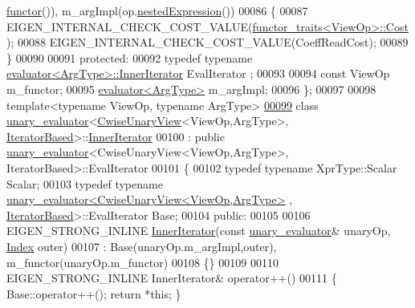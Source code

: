 \begin{DoxyCode}
      \hyperlink{group___core___module_af01271cdadcbcf195b5d3130ff2e1a48}{functor}()), m\_argImpl(op.\hyperlink{group___core___module_a21d59e387e600b1d650cb002175760b4}{nestedExpression}())
00086     \{
00087       EIGEN\_INTERNAL\_CHECK\_COST\_VALUE(\hyperlink{struct_eigen_1_1internal_1_1functor__traits}{functor\_traits<ViewOp>::Cost});
00088       EIGEN\_INTERNAL\_CHECK\_COST\_VALUE(CoeffReadCost);
00089     \}
00090 
00091   \textcolor{keyword}{protected}:
00092     \textcolor{keyword}{typedef} \textcolor{keyword}{typename} \hyperlink{struct_eigen_1_1internal_1_1evaluator}{evaluator<ArgType>::InnerIterator}        EvalIterator
      ;
00093     
00094     \textcolor{keyword}{const} ViewOp m\_functor;
00095     \hyperlink{struct_eigen_1_1internal_1_1evaluator}{evaluator<ArgType>} m\_argImpl;
00096 \};
00097 
00098 \textcolor{keyword}{template}<\textcolor{keyword}{typename} ViewOp, \textcolor{keyword}{typename} ArgType>
\hyperlink{class_eigen_1_1internal_1_1unary__evaluator_3_01_cwise_unary_view_3_01_view_op_00_01_arg_type_011a5afe598192a9657664b0cfbd26765b}{00099} \textcolor{keyword}{class }\hyperlink{struct_eigen_1_1internal_1_1unary__evaluator}{unary\_evaluator}<\hyperlink{group___core___module_class_eigen_1_1_cwise_unary_view}{CwiseUnaryView}<ViewOp,ArgType>, 
      \hyperlink{struct_eigen_1_1internal_1_1_iterator_based}{IteratorBased}>::\hyperlink{class_eigen_1_1_inner_iterator}{InnerIterator}
00100     : \textcolor{keyword}{public} \hyperlink{struct_eigen_1_1internal_1_1unary__evaluator}{unary\_evaluator}<CwiseUnaryView<ViewOp,ArgType>, IteratorBased>::EvalIterator
00101 \{
00102     \textcolor{keyword}{typedef} \textcolor{keyword}{typename} XprType::Scalar Scalar;
00103     \textcolor{keyword}{typedef} \textcolor{keyword}{typename} \hyperlink{struct_eigen_1_1internal_1_1unary__evaluator}{unary\_evaluator<CwiseUnaryView<ViewOp,ArgType>}
      , \hyperlink{struct_eigen_1_1internal_1_1_iterator_based}{IteratorBased}>::EvalIterator Base;
00104   \textcolor{keyword}{public}:
00105 
00106     EIGEN\_STRONG\_INLINE \hyperlink{class_eigen_1_1_inner_iterator}{InnerIterator}(\textcolor{keyword}{const} \hyperlink{struct_eigen_1_1internal_1_1unary__evaluator}{unary\_evaluator}& unaryOp, 
      \hyperlink{namespace_eigen_a62e77e0933482dafde8fe197d9a2cfde}{Index} outer)
00107       : Base(unaryOp.m\_argImpl,outer), m\_functor(unaryOp.m\_functor)
00108     \{\}
00109 
00110     EIGEN\_STRONG\_INLINE InnerIterator& operator++()
00111     \{ Base::operator++(); \textcolor{keywordflow}{return} *\textcolor{keyword}{this}; \}

\end{DoxyCode}
